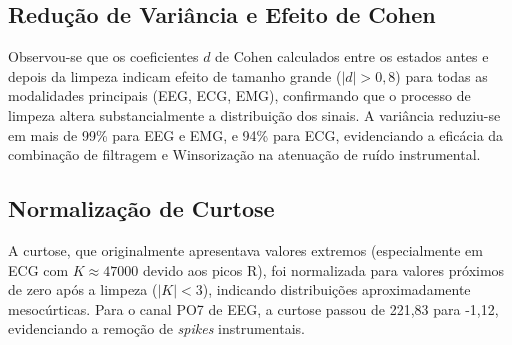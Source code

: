 \begin{table}[htbp]
    \centering
    \caption{Efeitos da limpeza de sinais (Sujeito 000)}
    \label{tab:cleaning_summary}
\end{table}

\subsection{Redução de Variância e Efeito de Cohen}

Observou-se que os coeficientes $d$ de Cohen calculados entre os estados antes e depois da limpeza indicam efeito de tamanho grande ($|d| > 0{,}8$) para todas as modalidades principais (EEG, ECG, EMG), confirmando que o processo de limpeza altera substancialmente a distribuição dos sinais. A variância reduziu-se em mais de 99\% para EEG e EMG, e 94\% para ECG, evidenciando a eficácia da combinação de filtragem e Winsorização na atenuação de ruído instrumental.

\subsection{Normalização de Curtose}

A curtose, que originalmente apresentava valores extremos (especialmente em ECG com $K \approx 47000$ devido aos picos R), foi normalizada para valores próximos de zero após a limpeza ($|K| < 3$), indicando distribuições aproximadamente mesocúrticas. Para o canal PO7 de EEG, a curtose passou de 221,83 para -1,12, evidenciando a remoção de \textit{spikes} instrumentais.

